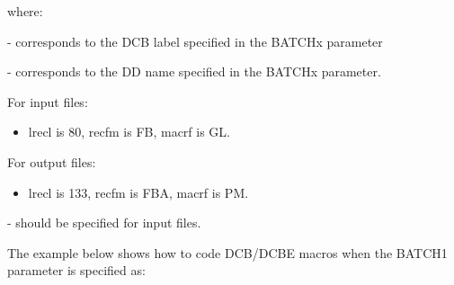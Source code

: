 \documentclass[letterpaper,10pt,english]{sphinxmanual}
\begin{document}
\begin{sphinxVerbatim}[commandchars=\\\{\}]
                             
  
\end{sphinxVerbatim}

where:

 - corresponds to the DCB label specified in the BATCHx parameter

 - corresponds to the DD name specified in the BATCHx parameter.

For input files:
\begin{itemize}
\item {} 
lrecl is 80, recfm is FB, macrf is GL.

\end{itemize}

For output files:
\begin{itemize}
\item {} 
lrecl is 133, recfm is FBA, macrf is PM.

\end{itemize}

 - should be specified for input files.

The example below shows how to code DCB/DCBE macros when the BATCH1 parameter is specified as:
\end{document}
